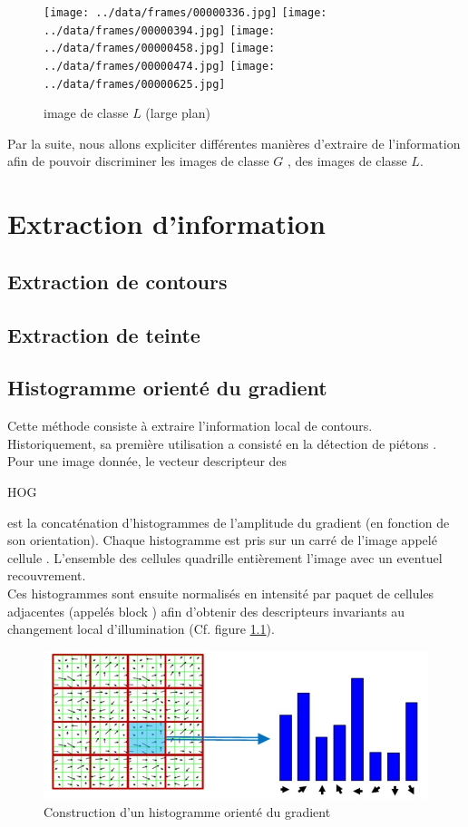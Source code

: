 \documentclass{book}
\begin{document}
\begin{figure}[H]
\begin{center}
\texttt{[image: ../data/frames/00000336.jpg]}
\texttt{[image: ../data/frames/00000394.jpg]}
\texttt{[image: ../data/frames/00000458.jpg]}
\texttt{[image: ../data/frames/00000474.jpg]}
\texttt{[image: ../data/frames/00000625.jpg]}
\end{center}
\caption{image de classe $L$ (large plan)}
\label{classeL}
\end{figure}

Par la suite, nous allons expliciter différentes manières d'extraire de l'information afin de pouvoir discriminer les images de classe $G$
, des images de classe $L$.

\chapter{Extraction d'information}
\section{Extraction de contours}
\section{Extraction de teinte}
\section{Histogramme orienté du gradient}

Cette méthode consiste à extraire l'information local de contours. Historiquement, sa première utilisation a consisté en 
la détection de piétons \cite{hog}. Pour une image donnée, le vecteur descripteur des \begin{itshape}HOG\end{itshape} est la concaténation
d'histogrammes de l'amplitude du gradient (en fonction de son orientation). Chaque histogramme est pris sur un carré de l'image
appelé \og cellule \fg{}. L'ensemble des cellules quadrille entièrement l'image avec un eventuel recouvrement.\\
Ces histogrammes sont ensuite normalisés en intensité par paquet de cellules adjacentes (appelés \og block \fg{}) afin d'obtenir des descripteurs 
invariants au changement local d'illumination (Cf. figure \ref{hog}).
\begin{figure}[H]
\begin{center}
\includegraphics[scale=0.5]{hog.jpg}
\end{center}
\caption{Construction d'un histogramme orienté du gradient \cite{hog2}}
\label{hog}
\end{figure}
\end{document}
